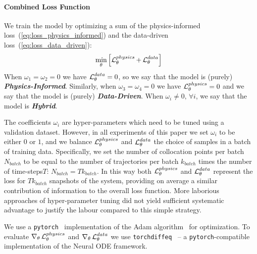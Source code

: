 \paragraph{Combined Loss Function} We train the model by optimizing a sum of the physics-informed loss~(\ref{eq:loss_physics_informed}) and the data-driven loss~(\ref{eq:loss_data_driven}):
\begin{equation}
    \label{eq:loss_combined}
    \min_\theta \left[\operatorname{\mathcal{L}}^{physics}_\theta + \operatorname{\mathcal{L}}^{data}_\theta\right]  
\end{equation}
When $\omega_1 = \omega_2 = 0$ we have $\operatorname{\mathcal{L}}^{data}_\theta = 0$, so we say that the model is (purely) \textit{\textbf{Physics-Informed}}. Similarly, when $\omega_3 = \omega_4 = 0$ we have $\operatorname{\mathcal{L}}^{physics}_\theta = 0$ and we say that the model is (purely) \textit{\textbf{Data-Driven}}. When $\omega_i \neq 0, \, \forall i$, we say that the model is \textit{\textbf{Hybrid}}. 

The coefficients $\omega_i$ are hyper-parameters which need to be tuned using a validation dataset. However, in all experiments of this paper we set $\omega_i$ to be either $0$ or $1$, and we balance $\operatorname{\mathcal{L}}^{physics}_\theta$ and $\operatorname{\mathcal{L}}^{data}_\theta$ the choice of samples in a batch of training data. Specifically, we set the number of collocation points per batch $N_{batch}$ to be equal to the number of trajectories per batch $k_{batch}$ times the number of time-steps$T$: $N_{batch} = Tk_{batch}$. In this way both $\operatorname{\mathcal{L}}^{physics}_\theta$ and $\operatorname{\mathcal{L}}^{data}_\theta$ represent the loss for $Tk_{batch}$ snapshots of the system, providing on average a similar contribution of information to the overall loss function. More laborious approaches of hyper-parameter tuning did not yield sufficient systematic advantage to justify the labour compared to this simple strategy.

We use a \texttt{pytorch}~\cite{NEURIPS2019_9015} implementation of the Adam algorithm~\cite{kingma2014adam} for optimization. To evaluate $\nabla_\theta \operatorname{\mathcal{L}}^{physics}_\theta$ and $\nabla_\theta \operatorname{\mathcal{L}}^{data}_\theta$ we use \texttt{torchdiffeq}~\cite{chen2018neural} -- a \texttt{pytorch}-compatible implementation of the Neural ODE framework. 

